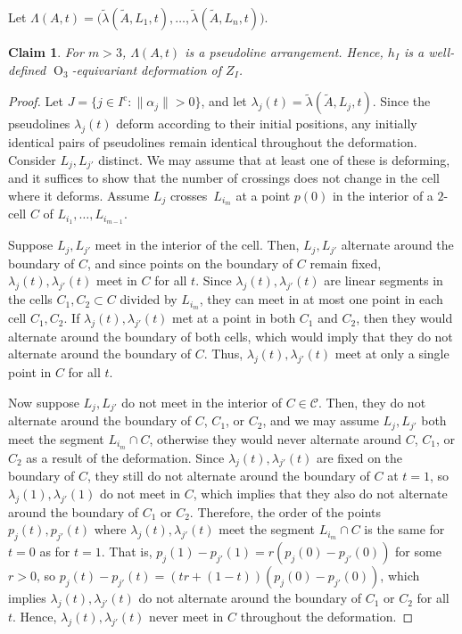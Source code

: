 \documentclass[11pt]{article}
\numberwithin{equation}{section}
\newtheorem{claim}[theorem]{Claim}
\theoremstyle{remark}
\let\mc\mathcal
\newcommand{\compl}[1]{{{#1}^{\text{c}}}}
\DeclareMathOperator{\orth}{O}
\begin{document}
Let $\Lambda(A,t) = \bigl(\tilde \lambda(\tilde A,L_1,t),\dots,\tilde \lambda(\tilde A,L_n,t)\bigr)$.

\begin{claim}\label{claim-lambda-arrangement}
For $m>3$, $\Lambda(A,t)$ is a pseudoline arrangement. Hence, $h_I$ is a well-defined $\orth_3$-equivariant deformation of $Z_I$.
\end{claim}

\newcommand{\xj}{{j'}}

\begin{proof}
Let $J = \{ j \in \compl{I}: \|\alpha_j\| > 0 \}$, and let $\lambda_j(t) = \tilde\lambda(\tilde A, L_j,t)$.
Since the pseudolines $\lambda_j(t)$ deform according to their initial positions, any initially identical pairs of pseudolines remain identical throughout the deformation. Consider $L_j,L_\xj$ distinct. We may assume that at least one of these is deforming, and it suffices to show that the number of crossings does not change in the cell where it deforms.
Assume $L_j$ crosses~$L_{i_m}$ at a point $p(0)$ in the interior of a $2$-cell $C$ of $L_{i_1},\dots,L_{i_{m-1}}$.

Suppose $L_j,L_\xj$ meet in the interior of the cell. Then, $L_j,L_\xj$ alternate around the boundary of $C$, and since points on the boundary of $C$ remain fixed, $\lambda_j(t),\lambda_\xj(t)$ meet in $C$ for all $t$. Since $\lambda_j(t),\lambda_\xj(t)$ are linear segments in the cells $C_1,C_2 \subset C$ divided by $L_{i_m}$, they can meet in at most one point in each cell $C_1,C_2$. If $\lambda_j(t),\lambda_\xj(t)$ met at a point in both $C_1$ and $C_2$, then they would alternate around the boundary of both cells, which would imply that they do not alternate around the boundary of $C$.
Thus, $\lambda_j(t),\lambda_\xj(t)$ meet at only a single point in $C$ for all $t$.

Now suppose $L_j,L_\xj$ do not meet in the interior of $C \in \mc{C}$.
Then, they do not alternate around the boundary of $C$, $C_1$, or $C_2$,
and we may assume $L_j,L_\xj$ both meet the segment $L_{i_m} \cap C$, otherwise they would never alternate around $C$, $C_1$, or $C_2$ as a result of the deformation.
Since $\lambda_j(t),\lambda_\xj(t)$ are fixed on the boundary of $C$, they still do not alternate around the boundary of $C$ at $t=1$, so $\lambda_j(1),\lambda_\xj(1)$ do not meet in $C$, which implies that they also do not alternate around the boundary of $C_1$ or $C_2$.
Therefore, the order of the points $p_j(t),p_{\xj}(t)$ where $\lambda_j(t),\lambda_\xj(t)$ meet the segment $L_{i_m} \cap C$ is the same for $t=0$ as for $t=1$.
That is, $p_{j}(1)-p_{\xj}(1)= r (p_{j}(0)-p_{\xj}(0))$ for some $r >0$, so
$p_{j}(t)-p_{\xj}(t)= (tr +(1-t)) (p_{j}(0)-p_{\xj}(0))$, which implies $\lambda_j(t),\lambda_\xj(t)$ do not alternate around the boundary of $C_1$ or $C_2$ for all $t$. Hence, $\lambda_j(t),\lambda_\xj(t)$ never meet in $C$ throughout the deformation.


\end{proof}
\end{document}
